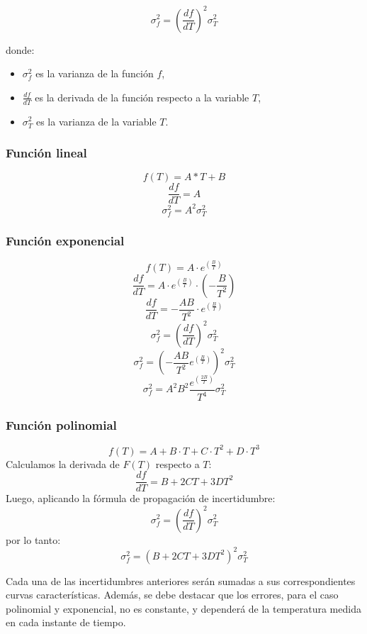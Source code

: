 \documentclass[conference]{IEEEtran}
\begin{document}
\begin{equation}
	\sigma_f^2 = \left( \frac{df}{dT} \right)^2 \sigma_T^2
\end{equation}

donde:
\begin{itemize}
	\item $\sigma_f^2$ es la varianza de la funci\'on $f$,
	\item $\frac{d f}{d T}$ es la derivada de la funci\'on respecto a la variable $T$,
	\item $\sigma_T^2$ es la varianza de la variable $T$.
\end{itemize}



\subsubsection{Funci\'on lineal}
	\[
		f(T) = A * T + B
	\]
	\[
		\frac{d f}{d T} = A
	\]
	\[
		\sigma_f^2 = A^2 \sigma_T^2
	\]

\subsubsection{Funci\'on exponencial}
	\[
	f(T) = A \cdot e^{\left( \frac{B}{T} \right)}
	\]
	\[
	\frac{d f}{d T} = A \cdot e^{\left( \frac{B}{T} \right)} \cdot \left( -\frac{B}{T^2} \right)
	\]
	\[
	\frac{d f}{d T} = -\frac{A B}{T^2} \cdot e^{\left( \frac{B}{T} \right)}
	\]
	\[
	\sigma_f^2 = \left( \frac{d f}{d T} \right)^2 \sigma_T^2
	\]
	\[
	\sigma_f^2 = \left( -\frac{A B}{T^2} e^{\left( \frac{B}{T} \right)} \right)^2 \sigma_T^2
	\]
	\[
	\sigma_f^2 = A^2 B^2 \frac{e^{\left( \frac{2B}{T} \right)}}{T^4} \sigma_T^2
	\]

\subsubsection{Funci\'on polinomial}
	
	\[
	f(T) = A + B \cdot T + C \cdot T^2 + D \cdot T^3
	\]
	Calculamos la derivada de \( F(T) \) respecto a \( T \):
	\[
	\frac{d f}{d T} = B + 2 C T + 3 D T^2
	\]
	Luego, aplicando la fórmula de propagación de incertidumbre:
	\[
	\sigma_f^2 = \left( \frac{d f}{d T} \right)^2 \sigma_T^2
	\]
	por lo tanto:
	\[
	\sigma_f^2 = \left( B + 2 C T + 3 D T^2 \right)^2 \sigma_T^2
	\]

Cada una de las incertidumbres anteriores ser\'an sumadas a sus correspondientes curvas caracter\'isticas. Adem\'as, se debe destacar que los errores, para el caso polinomial y exponencial, no es constante, y depender\'a de la temperatura medida en cada instante de tiempo.
\end{document}
